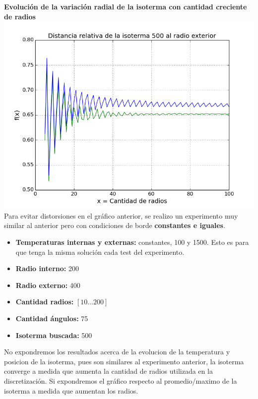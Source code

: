 \begin{enumerate}
	\textbf{Evolución de la variación radial de la isoterma con cantidad creciente de radios}\\
	\includegraphics[scale=0.5]{experimentos1a_1b/evolucion_estimacion_seguridad_isoterma/100ang_5to100radios.png}\\


Para evitar distorsiones en el gráfico anterior, se realizo un experimento muy similar al anterior pero con condiciones de borde \textbf{constantes e iguales}.
\begin{itemize}
	\item \textbf{Temperaturas internas y externas:} constantes, 100 y 1500. Esto es para que tenga la misma solución cada test del experimento.
	\item \textbf{Radio interno:} 200
	\item \textbf{Radio externo:} 400
	\item \textbf{Cantidad radios:} $[10\dots200]$
	\item \textbf{Cantidad ángulos:} 75
	\item \textbf{Isoterma buscada:} 500
\end{itemize}

No expondremos los resultados acerca de la evolucion de la temperatura y posicion de la isoterma, pues son similares al experimento anterior, la isoterma converge a medida que aumenta la cantidad de radios utilizada en la discretización. Si expondremos el gráfico respecto al promedio/maximo de la isoterma a medida que aumentan los radios.


\end{enumerate}
